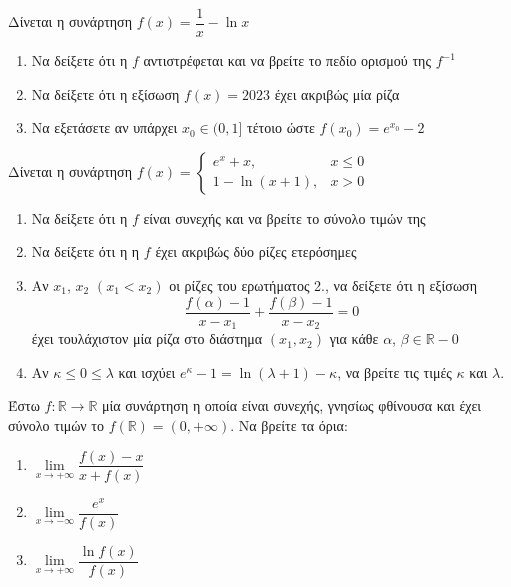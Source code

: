 \documentclass{presentation}
\begin{document}
\begin{askisi}
      Δίνεται η συνάρτηση $f(x)=\dfrac{1}{x}-\ln x$
      \begin{enumerate}
            \item<1-> Να δείξετε ότι η $f$ αντιστρέφεται και να βρείτε το πεδίο ορισμού της $f^{-1}$
            \item<2-> Να δείξετε ότι η εξίσωση $f(x)=2023$ έχει ακριβώς μία ρίζα
            \item<3-> Να εξετάσετε αν υπάρχει $x_0\in (0,1]$ τέτοιο ώστε $f(x_0)=e^{x_0}-2$
      \end{enumerate}
\end{askisi}



\begin{askisi}
      Δίνεται η συνάρτηση $f(x)=\begin{cases}
                  e^x+x,       & x\le 0 \\
                  1-\ln (x+1), & x>0
            \end{cases}$
      \begin{enumerate}
            \item<1-> Να δείξετε ότι η $f$ είναι συνεχής και να βρείτε το σύνολο τιμών της
            \item<2-> Να δείξετε ότι η η $f$ έχει ακριβώς δύο ρίζες ετερόσημες
            \item<3-> Αν $x_1$, $x_2$ $(x_1<x_2)$ οι ρίζες του ερωτήματος 2., να δείξετε ότι η εξίσωση
                  $$\frac{f(α)-1}{x-x_1}+\frac{f(β)-1}{x-x_2}=0$$
                  έχει τουλάχιστον μία ρίζα στο διάστημα $(x_1,x_2)$ για κάθε $α$, $β\in\mathbb{R}-{0}$
            \item<4-> Αν $κ\le 0\le λ$ και ισχύει $e^κ-1=\ln (λ+1)-κ$, να βρείτε τις τιμές $κ$ και $λ$.
      \end{enumerate}
\end{askisi}

\begin{askisi}
      Έστω $f:\mathbb{R}\to\mathbb{R}$ μία συνάρτηση η οποία είναι συνεχής, γνησίως φθίνουσα και έχει σύνολο τιμών το $f(\mathbb{R})=(0,+\infty)$. Να βρείτε τα όρια:
      \begin{enumerate}
            \item<1-> $\lim\limits_{x \to +\infty}{ \dfrac{f(x)-x}{x+f(x)} }$
            \item<2-> $\lim\limits_{x \to -\infty}{ \dfrac{e^x}{f(x)} }$
            \item<3-> $\lim\limits_{x \to +\infty}{ \dfrac{\ln f(x)}{f(x)} }$
      \end{enumerate}
\end{askisi}
\end{document}
